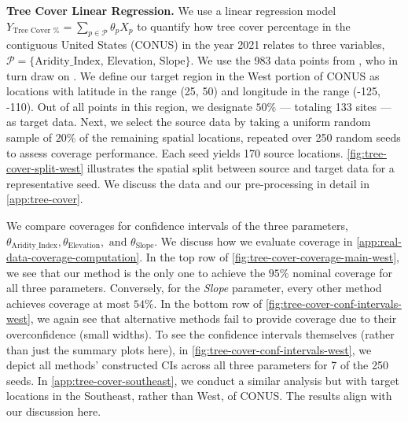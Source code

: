 
\textbf{Tree Cover Linear Regression.} We use a linear regression model
$
    Y_{\text{Tree Cover \%}} = \sum_{p \in \mathcal{P}} \theta_p X_p
$
to quantify how tree cover percentage in the contiguous United States (CONUS) in the year 2021 relates to three variables, $\mathcal{P} = \{\text{Aridity\_Index, Elevation, Slope}\}$.
We use the 983 data points from \citet{lu2024quantifying}, who in turn draw on \citep{usfs2023treecover,trabucco2019global,nasadem2020}. We define our target region in the West portion of CONUS as locations with latitude in the range (25, 50) and longitude in the range (-125, -110). Out of all points in this region, we designate $50\%$ --- totaling 133 sites --- as target data. Next, we select the source data by taking a uniform random sample of $20\%$ of the remaining spatial locations, repeated over 250 random seeds to assess coverage performance. Each seed yields 170 source locations. \cref{fig:tree-cover-split-west} illustrates the spatial split between source and target data for a representative seed. We discuss the data and our pre-processing in detail in \cref{app:tree-cover}.

We compare coverages for confidence intervals of the three parameters, $\theta_{\text{Aridity\_Index}}, \theta_{\text{Elevation}}, \text{ and } \theta_{\text{Slope}}$. We discuss how we evaluate coverage in \cref{app:real-data-coverage-computation}. In the top row of \cref{fig:tree-cover-coverage-main-west}, we see that our method is the only one to achieve the $95\%$ nominal coverage for all three parameters. Conversely, for the \textit{Slope} parameter, every other method achieves coverage at most $54\%$.
In the bottom row of \cref{fig:tree-cover-conf-intervals-west}, we again see that alternative methods fail to provide coverage due to their overconfidence (small widths). To see the confidence intervals themselves (rather than just the summary plots here), in \cref{fig:tree-cover-conf-intervals-west}, we depict all methods' constructed CIs across all three parameters for 7 of the 250 seeds. In \cref{app:tree-cover-southeast}, we conduct a similar analysis but with target locations in the Southeast, rather than West, of CONUS. The results align with our discussion here.

